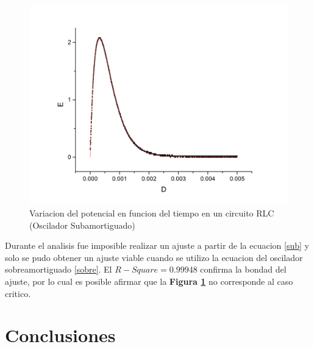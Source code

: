 \documentclass[11pt,a4paper]{article}
\begin{document}
\begin{figure}[H]
\centering
\includegraphics[scale=0.45]{RLC-Amortiguado_Critico(MasPiola)}
  \caption{Variacion del potencial en funcion del tiempo en un circuito RLC (Oscilador Subamortiguado)}
  \label{fig:RLC-sA}
\end{figure}

Durante el analisis fue imposible realizar un ajuste a partir de la ecuacion \eqref{sub} y solo se pudo obtener un ajuste viable cuando se utilizo la ecuacion del oscilador sobreamortiguado \eqref{sobre}. El $R-Square = 0.99948$ confirma la bondad del ajuste, por lo cual es posible afirmar que la \textbf{Figura \ref{fig:RLC-sA}} no corresponde al caso critico.




\section{Conclusiones}
\label{sec:conclusiones}




\end{document}
